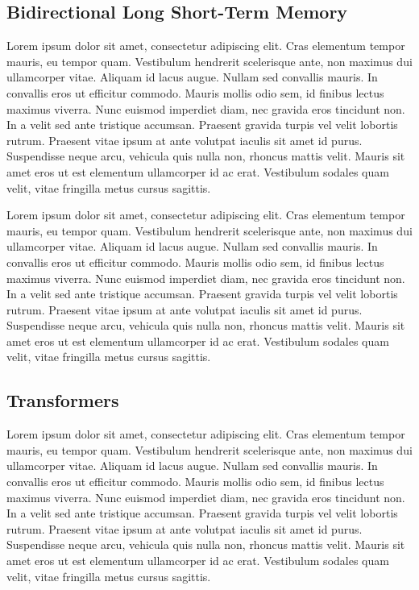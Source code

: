 \documentclass[conference]{IEEEtran}
\begin{document}
\subsection{Bidirectional Long Short-Term Memory}

Lorem ipsum dolor sit amet, consectetur adipiscing elit. Cras elementum tempor mauris, eu tempor quam. Vestibulum hendrerit scelerisque ante, non maximus dui ullamcorper vitae. Aliquam id lacus augue. Nullam sed convallis mauris. In convallis eros ut efficitur commodo. Mauris mollis odio sem, id finibus lectus maximus viverra. Nunc euismod imperdiet diam, nec gravida eros tincidunt non. In a velit sed ante tristique accumsan. Praesent gravida turpis vel velit lobortis rutrum. Praesent vitae ipsum at ante volutpat iaculis sit amet id purus. Suspendisse neque arcu, vehicula quis nulla non, rhoncus mattis velit. Mauris sit amet eros ut est elementum ullamcorper id ac erat. Vestibulum sodales quam velit, vitae fringilla metus cursus sagittis.

Lorem ipsum dolor sit amet, consectetur adipiscing elit. Cras elementum tempor mauris, eu tempor quam. Vestibulum hendrerit scelerisque ante, non maximus dui ullamcorper vitae. Aliquam id lacus augue. Nullam sed convallis mauris. In convallis eros ut efficitur commodo. Mauris mollis odio sem, id finibus lectus maximus viverra. Nunc euismod imperdiet diam, nec gravida eros tincidunt non. In a velit sed ante tristique accumsan. Praesent gravida turpis vel velit lobortis rutrum. Praesent vitae ipsum at ante volutpat iaculis sit amet id purus. Suspendisse neque arcu, vehicula quis nulla non, rhoncus mattis velit. Mauris sit amet eros ut est elementum ullamcorper id ac erat. Vestibulum sodales quam velit, vitae fringilla metus cursus sagittis.

\subsection{Transformers}

Lorem ipsum dolor sit amet, consectetur adipiscing elit. Cras elementum tempor mauris, eu tempor quam. Vestibulum hendrerit scelerisque ante, non maximus dui ullamcorper vitae. Aliquam id lacus augue. Nullam sed convallis mauris. In convallis eros ut efficitur commodo. Mauris mollis odio sem, id finibus lectus maximus viverra. Nunc euismod imperdiet diam, nec gravida eros tincidunt non. In a velit sed ante tristique accumsan. Praesent gravida turpis vel velit lobortis rutrum. Praesent vitae ipsum at ante volutpat iaculis sit amet id purus. Suspendisse neque arcu, vehicula quis nulla non, rhoncus mattis velit. Mauris sit amet eros ut est elementum ullamcorper id ac erat. Vestibulum sodales quam velit, vitae fringilla metus cursus sagittis.
\end{document}
